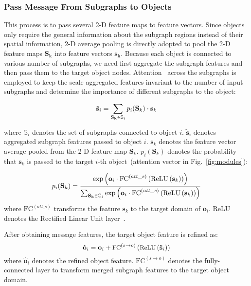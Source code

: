\documentclass[runningheads]{llncs}
\begin{document}
\subsubsection{Pass Message From Subgraphs to Objects}

This process is to pass several 2-D feature maps to feature vectors. 
Since objects only require the general information about the subgraph regions instead of their spatial information, 2-D average pooling is directly adopted to pool the 2-D feature maps $\mathbf{S_k}$ into feature vectors $\mathbf{s_k}$.  
Because each object is connected to various number of subgraphs, we need first aggregate the subgraph features and then pass them to the target object nodes. Attention~\cite{show_attend_tell} across the subgraphs is employed to keep the scale aggregated features invariant to the number of input subgraphs and determine the importance of different subgraphs to the object:

\begin{equation}
\small 
\tilde{\mathbf{s}}_i=\sum_{\mathbf{S_k}\in \mathbb{S}_i} p_i(\mathbf{S}_k) \cdot \mathbf{s}_k
\label{eq:message_pass_s2o}
\end{equation}

\noindent where $\mathbb{S}_i$ denotes the set of subgraphs connected to object $i$. $\tilde{\mathbf{s}}_i$ denotes aggregated subgraph features passed to object $i$. $\mathbf{s}_k$ denotes the feature vector average-pooled from the 2-D feature map $\mathbf{S}_k$. $p_i(\mathbf{S}_k)$ denotes the probability that $\mathbf{s}_k$ is passed to the target $i$-th object~(attention vector in Fig.~\ref{fig:modules}):

\begin{equation}\small
\small 
p_i(\mathbf{S}_k)=\frac{\exp{\left(\mathbf{o}_i \cdot \mathrm{FC}^{(att\_s)}\left(\mathrm{ReLU}\left(\mathbf{s}_k\right)\right)\right)}}{
		\sum_{\mathbf{S_k}\in \mathbb{C}_i} 
			\exp{\left(\mathbf{o}_i \cdot \mathrm{FC}^{(att\_s)}\left(\mathrm{ReLU}\left(\mathbf{s}_k\right)\right)\right)}}
\label{eq:message_pass_s2o_p}
\end{equation}
\noindent where $\mathrm{FC}^{(att\_s)}$ transforms the feature $\mathbf{s}_k$ to the target domain of $\mathbf{o}_i$. ReLU denotes the Rectified Linear Unit layer~\cite{relu}. 

After obtaining message features, the target object feature is refined as:
\begin{equation}\small
\hat{\mathbf{o}}_i=\mathbf{o}_i +  \textrm{FC}^{(s\rightarrow o)}\left(\textrm{ReLU}\left(\tilde{\mathbf{s}}_i\right)\right)
\label{eq:message_pass_s2o_refine}
\end{equation}
\noindent where $\hat{\mathbf{o}}_i$ denotes the refined object feature. $\textrm{FC}^{\left(s\rightarrow o\right)}$ denotes the fully-connected layer to transform merged subgraph features to the target object domain. 
\end{document}
